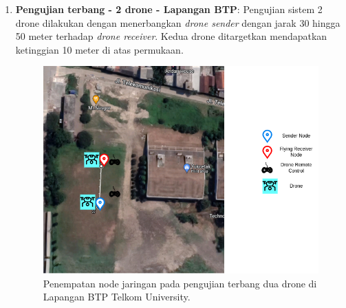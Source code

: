 \begin{enumerate}
	\item \textbf{Pengujian terbang - 2 drone - Lapangan BTP}: Pengujian sistem 2 drone dilakukan dengan menerbangkan \textit{drone sender} dengan jarak 30 hingga 50 meter terhadap \textit{drone receiver}. Kedua drone ditargetkan mendapatkan ketinggian 10 meter di atas permukaan.
	\begin{figure}[H]
		\centering
		\includegraphics[scale=0.5]{./assets/PetaTerbangDuaBTP}
		\caption{Penempatan node jaringan pada pengujian terbang dua drone di Lapangan BTP Telkom University.}
	\end{figure}

\end{enumerate}

